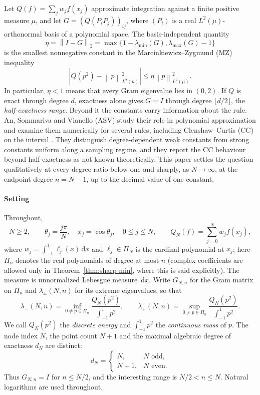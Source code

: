 \documentclass{siamart251216}
\newcommand{\Pn}{\Pi}
\newcommand{\lamin}{\lambda_{\min}}
\newcommand{\lamax}{\lambda_{\max}}
\newcommand{\norm}[1]{\left\lVert#1\right\rVert}
\newcommand{\dd}{\,\mathrm d}
\begin{document}
Let $Q(f)=\sum_j w_j f(x_j)$ approximate integration against a finite
positive measure $\mu$, and let $G=(Q(P_iP_j))_{ij}$, where $(P_i)$ is a real
$L^2(\mu)$-orthonormal basis of a polynomial space. The basis-independent quantity
\begin{equation}\label{eq:eta}
 \eta=\norm{I-G}_2
 =\max\{1-\lamin(G),\lamax(G)-1\}
\end{equation}
is the smallest nonnegative constant in the Marcinkiewicz--Zygmund (MZ)
inequality
\[
 |Q(p^2)-\norm p_{L^2(\mu)}^2|\le\eta\norm p_{L^2(\mu)}^2 .
\]
In particular, $\eta<1$ means that every Gram eigenvalue lies in $(0,2)$.
If $Q$ is exact through degree $d$, exactness alone gives $G=I$ through
degree $\lfloor d/2\rfloor$, the \emph{half-exactness range}. Beyond it the
constants carry information about the rule. An, Sommariva and Vianello (ASV)
study their role in polynomial approximation and examine them numerically
for several rules, including Clenshaw--Curtis (CC) on the interval
\cite{LIT-045}. They distinguish degree-dependent weak constants from strong
constants uniform along a sampling regime, and they report the CC behaviour
beyond half-exactness as not known theoretically. This paper settles the
question qualitatively at every degree ratio below one and sharply, as
$N\to\infty$, at the endpoint degree $n=N-1$, up to the decimal value of one
constant.

\paragraph{Setting}
Throughout,
\begin{equation}\label{eq:nodes}
 N\ge2,\qquad \theta_j=\frac{j\pi}{N},\quad x_j=\cos\theta_j,
 \quad 0\le j\le N,
 \qquad Q_N(f)=\sum_{j=0}^N w_j f(x_j),
\end{equation}
where $w_j=\int_{-1}^1\ell_j(x)\dd x$ and $\ell_j\in\Pn_N$ is
the cardinal polynomial at $x_j$; here $\Pn_n$ denotes the real polynomials
of degree at most $n$ (complex coefficients are allowed only in
Theorem~\ref{thm:sharp-min}, where this is said explicitly).
The measure is unnormalized Lebesgue
measure $\dd x$. Write $G_{N,n}$ for the Gram matrix on $\Pn_n$ and
$\lambda_\pm(N,n)$ for its extreme eigenvalues, so that
\begin{equation}\label{eq:variational}
 \lambda_-(N,n)=\inf_{0\ne p\in\Pn_n}
 \frac{Q_N(p^2)}{\int_{-1}^1p^2},\qquad
 \lambda_+(N,n)=\sup_{0\ne p\in\Pn_n}
 \frac{Q_N(p^2)}{\int_{-1}^1p^2}.
\end{equation}
We call $Q_N(p^2)$ the \emph{discrete energy} and $\int_{-1}^1p^2$ the
\emph{continuous mass} of $p$.
The node index $N$, the point count $N+1$ and the maximal algebraic degree
of exactness $d_N$ are distinct:
\begin{equation}\label{eq:ade}
 d_N=\begin{cases}N,&N\text{ odd},\\N+1,&N\text{ even}.
 \end{cases}
\end{equation}
Thus $G_{N,n}=I$ for $n\le N/2$, and the interesting
range is $N/2<n\le N$. Natural logarithms are used throughout.
\end{document}
